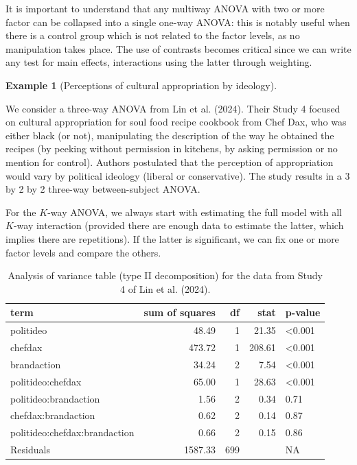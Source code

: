 \documentclass[
  11pt,
  letterpaper,
]{scrbook}
\theoremstyle{definition}
\newtheorem{example}{Example}[chapter]
\theoremstyle{remark}
\begin{document}
It is important to understand that any multiway ANOVA with two or more
factor can be collapsed into a single one-way ANOVA: this is notably
useful when there is a control group which is not related to the factor
levels, as no manipulation takes place. The use of contrasts becomes
critical since we can write any test for main effects, interactions
using the latter through weighting.

\begin{example}[Perceptions of cultural appropriation by
ideology]\protect\hypertarget{exm-LKUK24}{}\label{exm-LKUK24}

We consider a three-way ANOVA from Lin et al. (2024). Their Study 4
focused on cultural appropriation for soul food recipe cookbook from
Chef Dax, who was either black (or not), manipulating the description of
the way he obtained the recipes (by peeking without permission in
kitchens, by asking permission or no mention for control). Authors
postulated that the perception of appropriation would vary by political
ideology (liberal or conservative). The study results in a 3 by 2 by 2
three-way between-subject ANOVA.

For the \(K\)-way ANOVA, we always start with estimating the full model
with all \(K\)-way interaction (provided there are enough data to
estimate the latter, which implies there are repetitions). If the latter
is significant, we can fix one or more factor levels and compare the
others.

\hypertarget{tbl-anova-LKUK24}{}
\begin{table}
\caption{\label{tbl-anova-LKUK24}Analysis of variance table (type II decomposition) for the data from
Study 4 of Lin et al. (2024). }\tabularnewline

\centering
\begin{tabular}{lrrrl}
\toprule
term & sum of squares & df & stat & p-value\\
\midrule
politideo & 48.49 & 1 & 21.35 & <0.001\\
chefdax & 473.72 & 1 & 208.61 & <0.001\\
brandaction & 34.24 & 2 & 7.54 & <0.001\\
politideo:chefdax & 65.00 & 1 & 28.63 & <0.001\\
politideo:brandaction & 1.56 & 2 & 0.34 & 0.71\\
chefdax:brandaction & 0.62 & 2 & 0.14 & 0.87\\
politideo:chefdax:brandaction & 0.66 & 2 & 0.15 & 0.86\\
Residuals & 1587.33 & 699 &  & NA\\
\bottomrule
\end{tabular}
\end{table}


\end{example}
\end{document}
